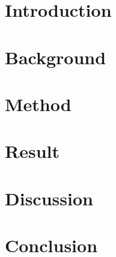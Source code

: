 \documentclass{article}
\begin{document}
\newpage
\tableofcontents
\newpage

\section{Introduction}

\section{Background}\label{background}

\section{Method}\label{method}

 
\section{Result}\label{result}



\section{Discussion}\label{discussion}


\section{Conclusion}\label{conclusion}
\end{document}
